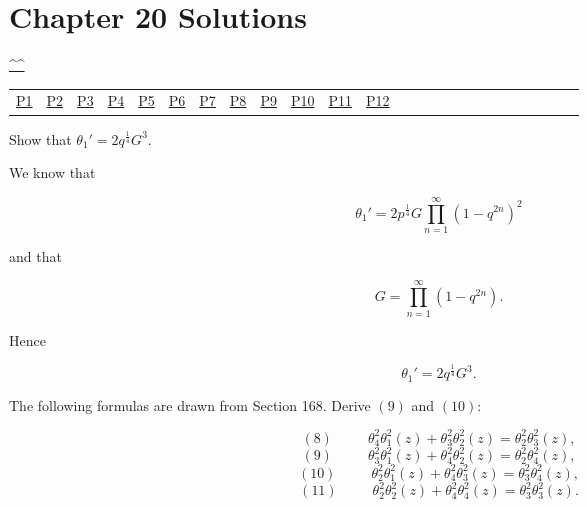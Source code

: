 \section{Chapter 20 Solutions}
\begin{center}\hyperref[toc]{\^{}\^{}}\end{center}
\begin{center}\begin{tabular}{lllllllllllllllllllllllll}
\hyperref[problem1chapter20]{P1} & \hyperref[problem2chapter20]{P2} & \hyperref[problem3chapter20]{P3} & \hyperref[problem4chapter20]{P4} & \hyperref[problem5chapter20]{P5} & \hyperref[problem6chapter20]{P6} & \hyperref[problem7chapter20]{P7} & \hyperref[problem8chapter20]{P8} & \hyperref[problem9chapter20]{P9} & \hyperref[problem10chapter20]{P10} & \hyperref[problem11chapter20]{P11} & \hyperref[problem12chapter20]{P12}
\end{tabular}\end{center}
\setcounter{problem}{0}
\setcounter{solution}{0}
\begin{problem}\label{problem1chapter20}
Show that $\theta_1'=2q^{\frac{1}{4}}G^3.$
\end{problem}
\begin{solution}
We know that

$$\theta_1' = 2 p^{\frac{1}{4}} G \displaystyle\prod_{n=1}^{\infty} (1 - q^{2n})^2$$

and that

$$G = \displaystyle\prod_{n=1}^{\infty} (1-q^{2n}).$$

Hence

$$\theta_1' = 2q^{\frac{1}{4}} G^3.$$
\end{solution}
\begin{problem}\label{problem2chapter20}
The following formulas are drawn from Section 168. Derive $(9)$ and $(10)$:

$$(8) \hspace{30pt} \theta_4^2\theta_1^2(z) + \theta_3^2 \theta_2^2(z) = \theta_2^2\theta_3^2(z),$$
$$(9) \hspace{30pt} \theta_3^2 \theta_1^2(z) + \theta_4^2\theta_2^2(z) = \theta_2^2\theta_4^2(z),$$
$$(10) \hspace{30pt} \theta_2^2\theta_1^2(z) + \theta_4^2\theta_3^2(z) = \theta_3^2\theta_4^2(z),$$
$$(11) \hspace{30pt} \theta_2^2\theta_2^2(z) + \theta_4^2 \theta_4^2(z) = \theta_3^2\theta_3^2(z).$$
\end{problem}
